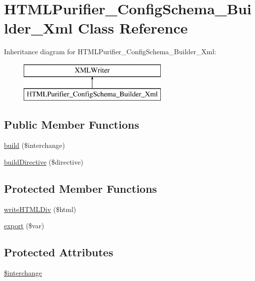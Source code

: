 \hypertarget{classHTMLPurifier__ConfigSchema__Builder__Xml}{\section{H\+T\+M\+L\+Purifier\+\_\+\+Config\+Schema\+\_\+\+Builder\+\_\+\+Xml Class Reference}
\label{classHTMLPurifier__ConfigSchema__Builder__Xml}
}
Inheritance diagram for H\+T\+M\+L\+Purifier\+\_\+\+Config\+Schema\+\_\+\+Builder\+\_\+\+Xml\+:\begin{figure}[H]
\begin{center}
\leavevmode
\includegraphics[height=2.000000cm]{classHTMLPurifier__ConfigSchema__Builder__Xml}
\end{center}
\end{figure}
\subsection*{Public Member Functions}
\begin{DoxyCompactItemize}
\item 
\hyperlink{classHTMLPurifier__ConfigSchema__Builder__Xml_a30188b8d734d47a09e91f9b561749a5e}{build} (\$interchange)
\item 
\hyperlink{classHTMLPurifier__ConfigSchema__Builder__Xml_a942ab5b289a0e2908d8bcaf24b580c67}{build\+Directive} (\$directive)
\end{DoxyCompactItemize}
\subsection*{Protected Member Functions}
\begin{DoxyCompactItemize}
\item 
\hyperlink{classHTMLPurifier__ConfigSchema__Builder__Xml_a4cd785a27825599cbac91d5e006155fc}{write\+H\+T\+M\+L\+Div} (\$html)
\item 
\hyperlink{classHTMLPurifier__ConfigSchema__Builder__Xml_ac6383bdf5d9959023c76b0bfaf7aff16}{export} (\$var)
\end{DoxyCompactItemize}
\subsection*{Protected Attributes}
\begin{DoxyCompactItemize}
\item 
\hyperlink{classHTMLPurifier__ConfigSchema__Builder__Xml_a0f53d08db98000fe4c9f0082a8fa7ba1}{\$interchange}
\end{DoxyCompactItemize}


